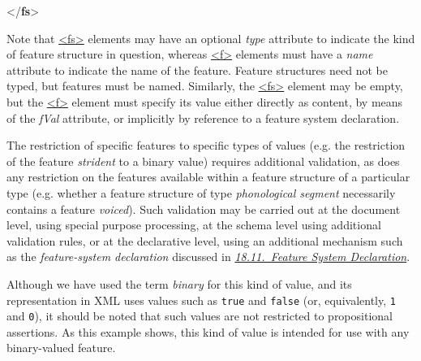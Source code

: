 \begin{shaded}
\mbox{}\newline 
{</\textbf{fs}>}\end{shaded}\egroup\par \noindent  Note that \hyperref[TEI.fs]{<fs>} elements may have an optional {\itshape type} attribute to indicate the kind of feature structure in question, whereas \hyperref[TEI.f]{<f>} elements must have a {\itshape name} attribute to indicate the name of the feature. Feature structures need not be typed, but features must be named.   Similarly, the \hyperref[TEI.fs]{<fs>} element may be empty, but the \hyperref[TEI.f]{<f>} element must specify its value either directly as content, by means of the {\itshape fVal} attribute, or implicitly by reference to a feature system declaration.\par
The restriction of specific features to specific types of values (e.g. the restriction of the feature \textit{strident} to a binary value) requires additional validation, as does any restriction on the features available within a feature structure of a particular type (e.g. whether a feature structure of type \textit{phonological segment} necessarily contains a feature \textit{voiced}). Such validation may be carried out at the document level, using special purpose processing, at the schema level using additional validation rules, or at the declarative level, using an additional mechanism such as the \textit{feature-system declaration} discussed in \textit{\hyperref[FD]{18.11.\ Feature System Declaration}}.\par
Although we have used the term \textit{binary} for this kind of value, and its representation in XML uses values such as \texttt{true} and \texttt{false} (or, equivalently, \texttt{1} and \texttt{0}), it should be noted that such values are not restricted to propositional assertions. As this example shows, this kind of value is intended for use with any binary-valued feature.
